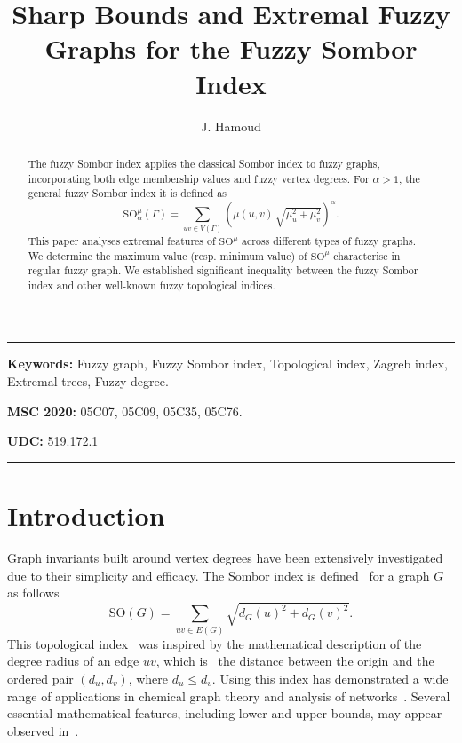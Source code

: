 \documentclass[12pt]{amsart}
\author{J. Hamoud}
\title[Sharp Bounds and Extremal Fuzzy Graphs]{Sharp Bounds and Extremal Fuzzy Graphs for the Fuzzy Sombor Index}
\date{}
\newcommand{\SO}{\mathrm{SO}}
\begin{document}
\begin{abstract}
The fuzzy Sombor index applies the classical Sombor index to fuzzy graphs, incorporating both edge membership values and fuzzy vertex degrees. For $\alpha>1$, the general fuzzy Sombor index it is defined as 
\[
 \mathrm{SO}^{\mu}_{\alpha}(\Gamma)=\sum_{uv\in V(\Gamma)}\left(\mu(u,v)\,\sqrt{\mu_u^2+\mu_v^2}\right)^{\alpha}.
\]
This paper analyses extremal features of $\mathrm{SO}^{\mu}$ across different types of fuzzy graphs. We determine the maximum value (resp. minimum value) of $\mathrm{SO}^{\mu}$ characterise in regular fuzzy graph. We established significant inequality between the fuzzy Sombor index and other well-known fuzzy topological indices.
\end{abstract}

\maketitle


\noindent\rule{15.9cm}{1.0pt}

\noindent
\textbf{
Keywords:} Fuzzy graph, Fuzzy Sombor index, Topological index, Zagreb index, Extremal trees, Fuzzy degree.


\medskip

\noindent
{\bf
MSC 2020:} 05C07, 05C09, 05C35, 05C76.

\medskip

\noindent
{\bf
UDC:} 519.172.1



\noindent\rule{15.9cm}{1.0pt}

\section{Introduction}
Graph invariants built around vertex degrees have been extensively investigated due to their simplicity and efficacy. The Sombor index is defined~\cite{Geometric2021approach} for a graph $G$ as follows
\[
\SO(G)=\sum_{uv\in E(G)}\sqrt{d_G(u)^2+d_G(v)^2}.
\]
This topological index~\cite{Cruz2021Gutman} was inspired by the mathematical description of the degree radius of an edge $uv$, which is~\cite{Das2021Shang} the distance between the origin and the ordered pair $(d_u, d_v)$, where $d_u \leq d_v$. 
Using this index has demonstrated a wide range of applications in chemical graph theory and analysis of networks~\cite{Cruz2021Gutman}. Several essential mathematical features, including lower and upper bounds, may appear observed in~\cite{Todeschini2000, Cruz2021Rada, Geometric2021approach, Das2021Cevik}. 
\end{document}
